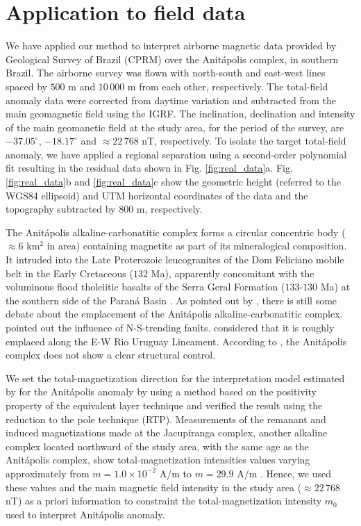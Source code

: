 \section{Application to field data}

We have applied our method to interpret airborne magnetic data provided by 
Geological Survey of Brazil (CPRM) over the Anit{\'a}polis complex, 
in southern Brazil. 
The airborne survey was flown with north-south and east-west lines spaced by $500$ m and $10\,000$ m from each other, respectively. 
The total-field anomaly data were corrected from daytime variation and 
subtracted from the main geomagnetic field using the IGRF. 
The inclination, declination and intensity of the main geomanetic field at the study area, 
for the period of the survey, are $-37.05^{\circ}$, $-18.17^{\circ}$ and 
$\approx 22 \, 768 $ nT, respectively.
To isolate the target total-field anomaly, we have applied 
a regional separation using a second-order polynomial fit resulting in the residual data shown in Fig. \ref{fig:real_data}a. 
Fig. \ref{fig:real_data}b and \ref{fig:real_data}c show the geometric height (referred to the WGS84 ellipsoid) and UTM horizontal coordinates of the data and the topography subtracted by $ 800 $ m, respectively. 

The Anit{\'a}polis alkaline-carbonatitic complex forms a circular concentric body 
($\approx 6$ km$^{2}$ in area) containing magnetite as part of its mineralogical 
composition. It intruded into the Late Proterozoic leucogranites of the Dom Feliciano 
mobile belt in the Early Cretaceous ($132$ Ma), apparently concomitant with the 
voluminous flood tholeiitic basalts of the Serra Geral Formation ($133$-$130$ Ma) 
at the southern side of the Paran{\'a} Basin \citep{gibson-1999, scheibe-etal2005}.
As pointed out by \citet{GOMES2018}, there is still some debate about the emplacement 
of the Anit{\'a}polis alkaline-carbonatitic complex. 
\citet{melcher-coutinho1966} pointed out the influence of N-S-trending faults. 
\citet{scheibe-etal2005} considered that it is roughly emplaced along the E-W Rio 
Uruguay Lineament. According to \citet{riccomini-etal2005}, the Anit{\'a}polis 
complex does not show a clear structural control. 

We set the total-magnetization direction for the interpretation model estimated by \cite{reis-seg-2019} for the Anitápolis anomaly by using a method based on the positivity property of the equivalent layer technique \cite[]{dampney1969,emilia1973} and verified the 
result using the reduction to the pole technique (RTP). 
Measurements of the remanant and induced magnetizations made at the Jacupiranga complex,
another alkaline complex located northward of the study area, 
with the same age as the Anit{\'a}polis complex, 
show total-magnetization intensities values varying approximately from $m = 1.0 \times 10^{-2}$ A/m to 
$m = 29.9$ A/m \citep[][ tb. 1]{valdivia-2009}.
Hence, we used these values and the main magnetic field intensity in the study area 
($\approx 22 \, 768 $ nT) as a priori information to constraint the 
total-magnetization intensity $m_{0}$ used to interpret Anit{\'a}polis anomaly.

